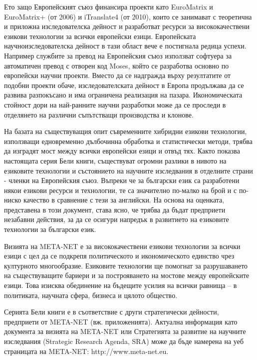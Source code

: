 \begin{multicols}{2}
Ето защо Европейският съюз финансира проекти като EuroMatrix и EuroMatrix+ (от 2006) и iTranslate4 (от 2010), които се занимават с теоретична и приложна изследователска дейност и разработват ресурси за висококачествени езикови технологии за всички европейски езици. Европейската научноизследователска дейност в тази област вече е постигнала редица успехи. Например службите за превод на Европейския съюз използват софтуера за автоматичен превод с отворен код Moses, който се разработва основно по европейски научни проекти. Вместо да се надгражда върху резултатите от подобни проекти обаче, изследователската дейност в Европа продължава да се развива разпокъсано и има ограничена реализация на пазара. Икономическата стойност дори на най-ранните научни разработки може да се проследи в отделянето на различни съпътстващи производства и клонове. 


На базата на съществуващия опит съвременните хибридни езикови технологии, използващи едновременно дълбочинна обработка и статистически методи, трябва да изградят мост между всички европейски езици и отвъд тях. Както показва настоящата серия Бели книги, съществуват огромни разлики в нивото на езиковите технологии и състоянието на научните изследвания в отделните страни - членки на Европейския съюз.
Въпреки че за български език са разработени някои езикови ресурси и технологии, те са значително по-малко на брой и с по-ниско качество в сравнение с тези за английски.
На основа на оценката, представена в този документ, става ясно, че трябва да бъдат предприети незабавни действия, за да се осигури напредък в развитието на езиковите технологии за български език.

Визията на META-NET е за висококачествени езикови технологии за всички езици с цел да се подкрепя политическото и икономическото единство чрез културното многообразие. Езиковите технологии ще помогнат за разрушаването на съществуващите бариери и за построяването на мостове между европейските езици. Това изисква обединение на бъдещите усилия на всички равнища – в политиката, научната сфера, бизнеса и цялото общество.

Серията Бели книги е в съответствие с други стратегически дейности, предприети от META-NET (вж. приложенията). Актуална информация като документа за визията на META-NET \cite{Meta1} или Стратегията за развитие на научните изследвания (Strategic Research Agenda, SRA) може да бъде намерена на уеб страницата на META-NET: http://www.meta-net.eu.
  \end{multicols}

